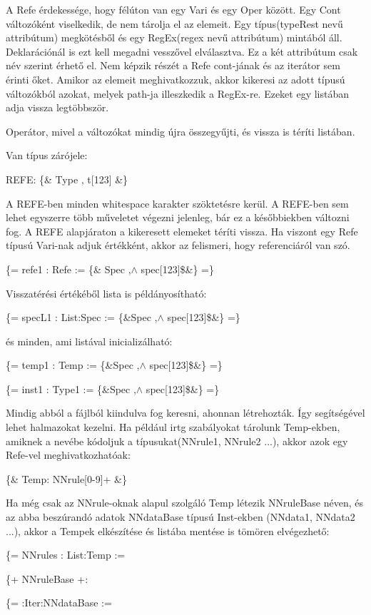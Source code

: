 {A Refe érdekessége, hogy félúton van egy Vari és egy Oper között.
Egy Cont változóként viselkedik, de nem tárolja el az elemeit.
Egy típus(typeRest nevű attribútum) megkötésből és egy RegEx(regex nevű attribútum) mintából áll.
Deklarációnál is ezt kell megadni vesszővel elválasztva.
Ez a két attribútum csak név szerint érhető el.
Nem képzik részét a Refe cont-jának és az iterátor sem érinti őket.
Amikor az elemeit meghivatkozzuk, akkor kikeresi az adott típusú változókból azokat,
melyek path-ja illeszkedik a RegEx-re.
Ezeket egy listában adja vissza legtöbbször.

Operátor, mivel a változókat mindig újra összegyűjti, és vissza is téríti listában.

Van típus zárójele:

REFE: \{\& Type , t[123] \&\}

A REFE-ben minden whitespace karakter szöktetésre kerül.
A REFE-ben sem lehet egyszerre több műveletet végezni jelenleg, bár ez a későbbiekben változni fog.
A REFE alapjáraton a kikeresett elemeket téríti vissza.
Ha viszont egy Refe típusú Vari-nak adjuk értékként, akkor az felismeri, hogy referenciáról van szó.

\{= refe1 : Refe := \{\& Spec ,$\land$ spec[123]\$\&\} =\}

Visszatérési értékéből lista is példányosítható:

\{= specL1 : List:Spec := \{\&Spec ,$\land$ spec[123]\$\&\} =\}

és minden, ami listával inicializálható:

\{= temp1 : Temp := \{\&Spec ,$\land$ spec[123]\$\&\} =\}

\{= inst1 : Type1 := \{\&Spec ,$\land$ spec[123]\$\&\} =\}

Mindig abból a fájlból kiindulva fog keresni, ahonnan létrehozták.
Így segítségével lehet halmazokat kezelni.
Ha például irtg szabályokat tárolunk Temp-ekben, amiknek a nevébe kódoljuk a típusukat(NNrule1, NNrule2 ...),
akkor azok egy Refe-vel meghivatkozhatóak:

\{\& Temp: NNrule[0-9]+ \&\}

Ha még csak az NNrule-oknak alapul szolgáló Temp létezik NNruleBase néven, 
és az abba beszúrandó adatok  NNdataBase típusú Inst-ekben (NNdata1, NNdata2 ...),
akkor a Tempek elkészítése és listába mentése is tömören elvégezhető:

\{= NNrules : List:Temp := 

\{+ NNruleBase +: 

\{= :Iter:NNdataBase := 

}
